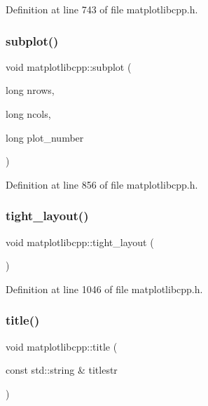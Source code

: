 Definition at line 743 of file matplotlibcpp.\+h.

\mbox{\label{namespacematplotlibcpp_a78f4b6d50e52d1782d52df692232f4e1}} 
\subsubsection{\texorpdfstring{subplot()}{subplot()}}
{\footnotesize\ttfamily void matplotlibcpp\+::subplot (\begin{DoxyParamCaption}\item[{long}]{nrows,  }\item[{long}]{ncols,  }\item[{long}]{plot\+\_\+number }\end{DoxyParamCaption})\hspace{0.3cm}{\ttfamily [inline]}}



Definition at line 856 of file matplotlibcpp.\+h.

\mbox{\label{namespacematplotlibcpp_a14e2b6e595e057f553ef7b14ddcda82a}} 
\subsubsection{\texorpdfstring{tight\_layout()}{tight\_layout()}}
{\footnotesize\ttfamily void matplotlibcpp\+::tight\+\_\+layout (\begin{DoxyParamCaption}{ }\end{DoxyParamCaption})\hspace{0.3cm}{\ttfamily [inline]}}



Definition at line 1046 of file matplotlibcpp.\+h.

\mbox{\label{namespacematplotlibcpp_aa9e0ff1c2399713260568f29c3e2188b}} 
\subsubsection{\texorpdfstring{title()}{title()}}
{\footnotesize\ttfamily void matplotlibcpp\+::title (\begin{DoxyParamCaption}\item[{const std\+::string \&}]{titlestr }\end{DoxyParamCaption})\hspace{0.3cm}{\ttfamily [inline]}}



